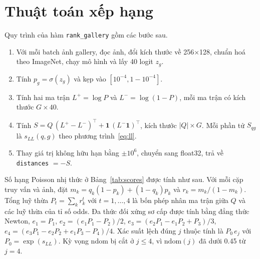 \documentclass[11pt,a4paper]{article}
\newcommand{\ndom}{\mathrm{ndom}}
\begin{document}
\section{Thuật toán xếp hạng}

Quy trình của hàm \texttt{rank\_gallery} gồm các bước sau.

\begin{enumerate}[leftmargin=1.6em]
\item Với mỗi batch ảnh gallery, đọc ảnh, đổi kích thước về 256×128, chuẩn hoá theo ImageNet, chạy mô hình và lấy 40 logit $z_g$.
\item Tính $p_g=\sigma(z_g)$ và kẹp vào $[10^{-4},1-10^{-4}]$.
\item Tính hai ma trận $L^{+}=\log P$ và $L^{-}=\log(1-P)$, mỗi ma trận có kích thước $G\times40$.
\item Tính $S=Q\,(L^{+}-L^{-})^{\top}+\mathbf{1}\,(L^{-}\mathbf{1})^{\top}$, kích thước $|Q|\times G$. Mỗi phần tử $S_{qg}$ là $s_{LL}(q,g)$ theo phương trình~\eqref{eq:ll}.
\item Thay giá trị không hữu hạn bằng $\pm10^6$, chuyển sang float32, trả về \texttt{distances} $=-S$.
\end{enumerate}

Số hạng Poisson nhị thức ở Bảng~\ref{tab:scores} được tính như sau. Với mỗi cặp truy vấn và ảnh, đặt $m_k=q_k(1-p_k)+(1-q_k)p_k$ và $r_k=m_k/(1-m_k)$. Tổng luỹ thừa $P_t=\sum_k r_k^t$ với $t=1,\dots,4$ là bốn phép nhân ma trận giữa $Q$ và các luỹ thừa của tỉ số odds. Đa thức đối xứng sơ cấp được tính bằng đẳng thức Newton, $e_1=P_1$, $e_2=(e_1P_1-P_2)/2$, $e_3=(e_2P_1-e_1P_2+P_3)/3$, $e_4=(e_3P_1-e_2P_2+e_1P_3-P_4)/4$. Xác suất lệch đúng $j$ thuộc tính là $P_0\,e_j$ với $P_0=\exp(s_{LL})$. Kỳ vọng ndom bị cắt ở $j\le4$, vì $\ndom(j)$ đã dưới 0.45 từ $j=4$.
\end{document}
